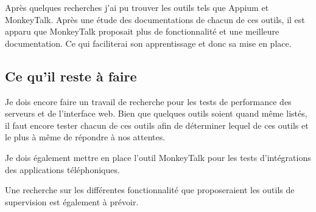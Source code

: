 Après quelques recherches j'ai pu trouver les outils tels que Appium et MonkeyTalk. Après une étude des documentations de chacun de ces outils, il est apparu que MonkeyTalk proposait plus de fonctionnalité et une meilleure documentation. Ce qui faciliterai son apprentissage et donc sa mise en place.


\subsection{Ce qu'il reste à faire}

Je dois encore faire un travail de recherche pour les tests de performance des serveurs et de l'interface web. Bien que quelques outils soient quand même listés, il faut encore tester chacun de ces outils afin de déterminer lequel de ces outils et le plus à même de répondre à nos attentes.

Je dois également mettre en place l'outil MonkeyTalk pour les tests d'intégrations des applications téléphoniques.

Une recherche sur les différentes fonctionnalité que proposeraient les outils de supervision est également à prévoir. 